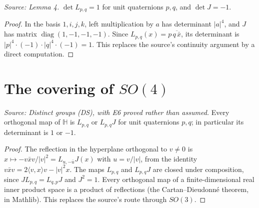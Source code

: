 \begin{lemma}[Determinants]
  \label{lem:lpq-det}
  \leanok
  \textit{Source: Lemma 4.}
  \(\det L_{p,q}=1\) for unit quaternions \(p,q\), and
  \(\det J=-1\).
\end{lemma}
\begin{proof}
  \leanok
  In the basis \(1,i,j,k\), left multiplication by \(a\) has determinant
  \(|a|^4\), and \(J\) has matrix \(\operatorname{diag}(1,-1,-1,-1)\).
  Since \(L_{p,q}(x)=p\,\overline{q\,\bar x}\), its determinant is
  \(|p|^4\cdot(-1)\cdot|q|^4\cdot(-1)=1\). This replaces the source's
  continuity argument by a direct computation.
\end{proof}

\section{The covering of \texorpdfstring{\(SO(4)\)}{SO(4)}}

\begin{theorem}
  \label{thm:orthogonal-lpq}
  \leanok
  \textit{Source: Distinct groups (DS), with E6 proved rather than assumed.}
  Every orthogonal map of \(\mathbb H\) is \(L_{p,q}\) or \(L_{p,q}J\) for
  unit quaternions \(p,q\); in particular its determinant is \(1\) or
  \(-1\).
\end{theorem}
\begin{proof}
  \leanok
  The reflection in the hyperplane orthogonal to \(v\neq0\) is
  \(x\mapsto-v\bar xv/|v|^2=L_{u,-\bar u}J(x)\) with \(u=v/|v|\), from the
  identity \(v\bar xv=2\langle v,x\rangle v-|v|^2x\). The maps \(L_{p,q}\)
  and \(L_{p,q}J\) are closed under composition, since
  \(JL_{p,q}=L_{q,p}J\) and \(J^2=1\). Every orthogonal map of a
  finite-dimensional real inner product space is a product of reflections
  (the Cartan--Dieudonn\'e theorem, in Mathlib). This replaces the source's
  route through \(SO(3)\).
\end{proof}

